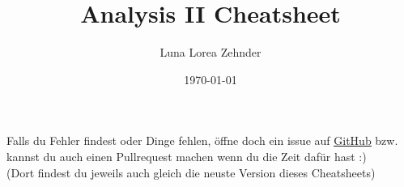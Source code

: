 \documentclass[8pt]{article}
\title{Analysis II Cheatsheet}
\author{Luna Lorea Zehnder}
\date{\today}
\begin{document}
\begin{multicols*}{3}
  
  \maketitle %
  Falls du Fehler findest oder Dinge fehlen, öffne doch ein issue auf \color{Maroon4}\href{https://github.com/LunaLorea/Analysis-II-Cheatsheet}{\underline{GitHub}}\color{defaultcolor}  \;bzw. kannst du auch einen Pullrequest machen wenn du die Zeit dafür hast :)\\
  (Dort findest du jeweils auch gleich die neuste Version dieses Cheatsheets)
  
  
  
  
  \columnbreak

\end{multicols*}
\end{document}
